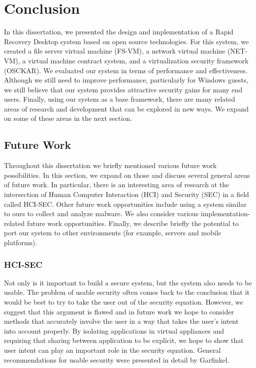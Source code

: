 
\chapter{Conclusion}

In this dissertation, we presented the design and implementation of a Rapid Recovery Desktop system based on open source technologies. For this system, we created a file server virtual machine (FS-VM), a network virtual machine (NET-VM), a virtual machine contract system, and a virtualization security framework (OSCKAR). We evaluated our system in terms of performance and effectiveness. Although we still need to improve performance, particularly for Windows guests, we still believe that our system provides attractive security gains for many end users. Finally, using our system as a base framework, there are many related areas of research and development that can be explored in new ways. We expand on some of these areas in the next section.

\section{Future Work}

Throughout this dissertation we briefly mentioned various future work possibilities. In this section, we expand on those and discuss several general areas of future work. In particular, there is an interesting area of research at the intersection of Human Computer Interaction (HCI) and Security (SEC) in a field called HCI-SEC. Other future work opportunities include using a system similar to ours to collect and analyze malware. We also consider various implementation-related future work opportunities. Finally, we describe briefly the potential to port our system to other environments (for example, servers and mobile platforms).

\subsection{HCI-SEC}

Not only is it important to build a secure system, but the system also needs to be usable. The problem of usable security often comes back to the conclusion that it would be best to try to take the user out of the security equation\cite{cranor_2008}. However, we suggest that this argument is flawed and in future work we hope to consider methods that accurately involve the user in a way that takes the user's intent into account properly. By isolating applications in virtual appliances and requiring that sharing between application to be explicit, we hope to show that user intent can play an important role in the security equation. General recommendations for usable security were presented in detail by Garfinkel\cite{simson_2006}.

